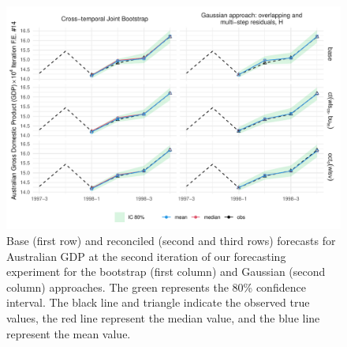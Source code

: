 \documentclass[a4paper,11pt]{article}
\theoremstyle{definition}
\begin{document}
\begin{figure}[t]
\centering
\includegraphics[width = 1\linewidth]{fig/AusGDP/gdptrace14.pdf}
\caption{Base (first row) and reconciled (second and third rows) forecasts for Australian GDP at the second iteration of our forecasting experiment for the bootstrap (first column) and Gaussian (second column) approaches. The green represents the 80\% confidence interval. The black line and triangle indicate the observed true values, the red line represent the median value, and the blue line represent the mean value.}
\label{fig:gdptrace}
\end{figure}
\end{document}
